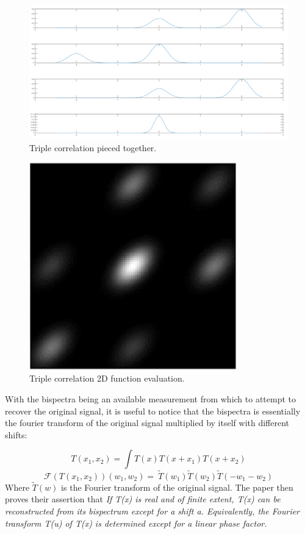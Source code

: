 \documentclass[a4paper]{article}
\begin{document}
\begin{figure}
\centering
\includegraphics[width=1.0\textwidth]{triple_correlation.png}
\caption{\label{fig:triple_correlation_explanation}Triple correlation pieced together.}
\end{figure}

\begin{figure}
\centering
\includegraphics[width=0.8\textwidth]{triple_correlation_img.png}
\caption{\label{fig:triple_correlation_img}Triple correlation 2D function evaluation.}
\end{figure}
With the bispectra being an available measurement from which to attempt to recover the original signal,  it is useful to notice that the bispectra is essentially the fourier transform of the original signal multiplied by itself with different shifts:

\[T\left(x_1,x_2\right)=  \int T\left(x\right)T\left(x+x_1\right)T(x+x_2)\]
\[\mathcal{F}\left(T\left(x_1,x_2\right)\right)\left(w_1,w_2\right)=\ \widetilde{T}(w_1)\widetilde{T}(w_2)\widetilde{T}(-w_1-w_2)\]
Where $\widetilde{T}(w)$ is the Fourier transform of the original signal. The paper then proves their assertion that \textit{If T(x) is real and of finite extent, T(x) can be reconstructed from its bispectrum except for a shift a. Equivalently, the Fourier transform T(u) of T(x) is determined except for a linear phase factor.}
\end{document}
